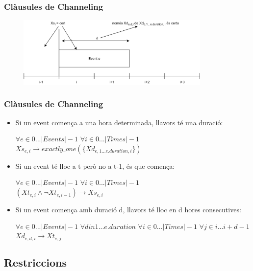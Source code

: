 \documentclass[13pt]{beamer}
\begin{document}
  \begin{frame}
    \frametitle{Clàusules de Channeling} 
    \begin{figure}[p]
      \includegraphics[width=0.85\textwidth]{Diagrames/DiagramaChanneling.png}
      \label{fig:procs}
    \end{figure} 

  
    \end{frame}
  

  \begin{frame}
  \frametitle{Clàusules de Channeling}  

  \begin{itemize}
    \item Si un event comença a una hora determinada, llavors té una duració: 
  \begin{center} 
  $\forall e \in 0 ... |Events|-1$ $\forall i \in 0 ... |Times|-1$ \\
  $Xs_{e,i} \rightarrow exactly\_one(\{Xd_{e,1 ... e.duration,i}\})$\end{center}
    \item Si un event té lloc a t però no a t-1, és que comença: 
  \begin{center} 
  $\forall e \in 0 ... |Events|-1$ $\forall i \in 0 ... |Times|-1$ \\$(Xt_{e,i} \land \neg Xt_{e,i-1}) \rightarrow Xs_{e,i}$ \end{center}
    \item Si un event comença amb duració d, llavors té lloc en d hores consecutives: 
    \begin{center} 
      $\forall e \in 0 ... |Events|-1$ $\forall d in 1 ... e.duration$ $\forall i \in 0 ... |Times|-1$ $\forall j \in i ... i+d-1$ \\
      $Xd_{e,d,i} \rightarrow Xt_{e,j}$    
    \end{center}
  \end{itemize}

  \end{frame}

  \subsection{Restriccions}
\end{document}
